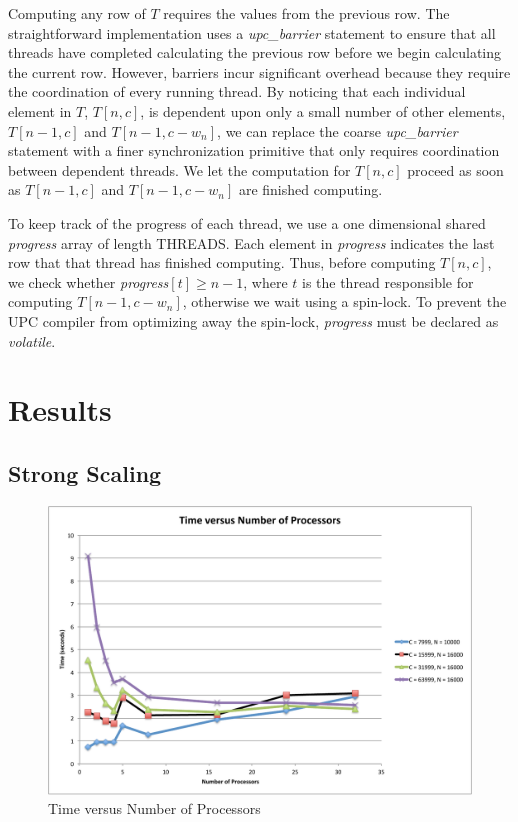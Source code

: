 \documentclass[11pt]{article} %
\begin{document}
Computing any row of $T$ requires the values from the previous row. The straightforward implementation uses a \emph{upc\_barrier} statement to ensure that all threads have completed calculating the previous row before we begin calculating the current row. However, barriers incur significant overhead because they require the coordination of every running thread. By noticing that each individual element in $T$, $T[n,c]$, is dependent upon only a small number of other elements, $T[n-1,c]$ and $T[n-1,c-w_n]$, we can replace the coarse \emph{upc\_barrier} statement with a finer synchronization primitive that only requires coordination between dependent threads. We let the computation for $T[n,c]$ proceed as soon as $T[n-1,c]$ and $T[n-1,c-w_n]$ are finished computing.

To keep track of the progress of each thread, we use a one dimensional shared \emph{progress} array of length THREADS. Each element in \emph{progress} indicates the last row that that thread has finished computing. Thus, before computing $T[n,c]$, we check whether \emph{progress}$[t] \geq n-1$, where $t$ is the thread responsible for computing $T[n-1,c-w_n]$, otherwise we wait using a spin-lock. To prevent the UPC compiler from optimizing away the spin-lock, \emph{progress} must be declared as \emph{volatile}.

\section{Results}

\subsection{Strong Scaling}

\begin{figure}
\begin{centering}
\includegraphics[width=0.5\paperwidth]{figures/TvsP.pdf}
\caption{Time versus Number of Processors}
\label{TvsP}
\end{centering}
\end{figure}
\end{document}
